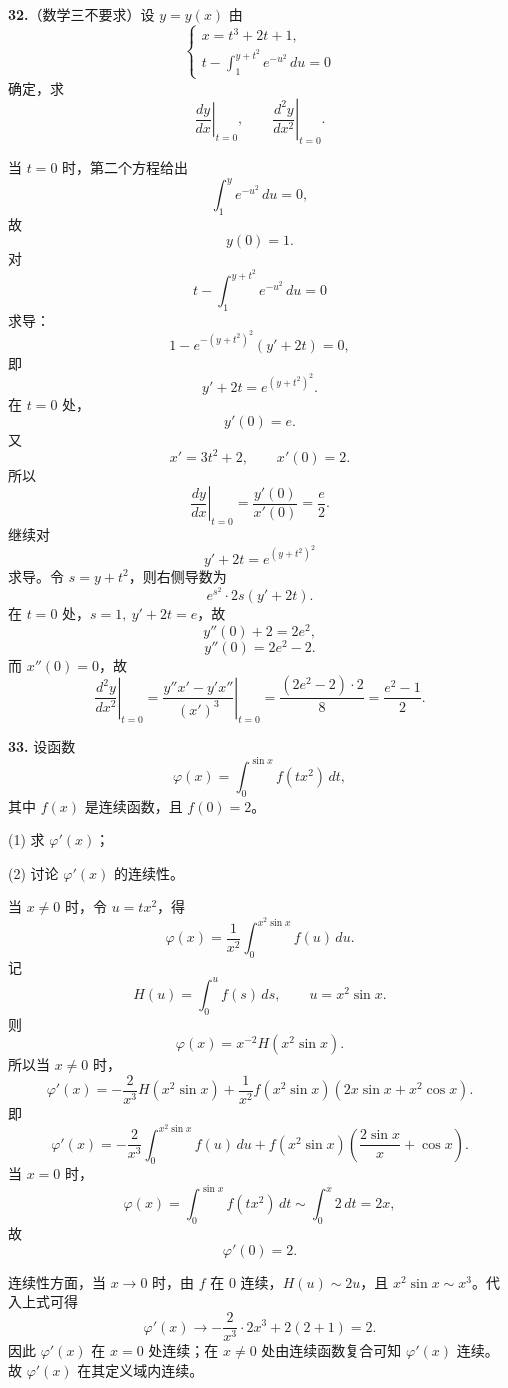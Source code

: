 \begin{problemblock}
\textbf{32.}（数学三不要求）设 \(y=y(x)\) 由
\[
\begin{cases}
x=t^3+2t+1,\\
t-\displaystyle\int_1^{y+t^2}e^{-u^2}\,du=0
\end{cases}
\]
确定，求
\[
\left.\frac{dy}{dx}\right|_{t=0},\qquad
\left.\frac{d^2y}{dx^2}\right|_{t=0}.
\]
\end{problemblock}

\begin{solutionblock}
当 \(t=0\) 时，第二个方程给出
\[
\int_1^y e^{-u^2}\,du=0,
\]
故
\[
y(0)=1.
\]
对
\[
t-\int_1^{y+t^2}e^{-u^2}\,du=0
\]
求导：
\[
1-e^{-(y+t^2)^2}(y'+2t)=0,
\]
即
\[
y'+2t=e^{(y+t^2)^2}.
\]
在 \(t=0\) 处，
\[
y'(0)=e.
\]
又
\[
x'=3t^2+2,\qquad x'(0)=2.
\]
所以
\[
\left.\frac{dy}{dx}\right|_{t=0}=\frac{y'(0)}{x'(0)}=\frac e2.
\]
继续对
\[
y'+2t=e^{(y+t^2)^2}
\]
求导。令 \(s=y+t^2\)，则右侧导数为
\[
e^{s^2}\cdot2s(y'+2t).
\]
在 \(t=0\) 处，\(s=1,\ y'+2t=e\)，故
\[
y''(0)+2=2e^2,
\]
\[
y''(0)=2e^2-2.
\]
而 \(x''(0)=0\)，故
\[
\left.\frac{d^2y}{dx^2}\right|_{t=0}
=\left.\frac{y''x'-y'x''}{(x')^3}\right|_{t=0}
=\frac{(2e^2-2)\cdot2}{8}
=\frac{e^2-1}{2}.
\]
\end{solutionblock}

\begin{problemblock}
\textbf{33.} 设函数
\[
\varphi(x)=\int_0^{\sin x}f(tx^2)\,dt,
\]
其中 \(f(x)\) 是连续函数，且 \(f(0)=2\)。

(1) 求 \(\varphi'(x)\)；

(2) 讨论 \(\varphi'(x)\) 的连续性。
\end{problemblock}

\begin{solutionblock}
当 \(x\ne0\) 时，令 \(u=tx^2\)，得
\[
\varphi(x)=\frac1{x^2}\int_0^{x^2\sin x}f(u)\,du.
\]
记
\[
H(u)=\int_0^u f(s)\,ds,\qquad u=x^2\sin x.
\]
则
\[
\varphi(x)=x^{-2}H(x^2\sin x).
\]
所以当 \(x\ne0\) 时，
\[
\varphi'(x)
=-\frac2{x^3}H(x^2\sin x)
+\frac1{x^2}f(x^2\sin x)(2x\sin x+x^2\cos x).
\]
即
\[
\varphi'(x)=
-\frac{2}{x^3}\int_0^{x^2\sin x}f(u)\,du
+f(x^2\sin x)\left(\frac{2\sin x}{x}+\cos x\right).
\]
当 \(x=0\) 时，
\[
\varphi(x)=\int_0^{\sin x}f(tx^2)\,dt
\sim\int_0^{x}2\,dt=2x,
\]
故
\[
\varphi'(0)=2.
\]

连续性方面，当 \(x\to0\) 时，由 \(f\) 在 0 连续，\(H(u)\sim2u\)，且 \(x^2\sin x\sim x^3\)。代入上式可得
\[
\varphi'(x)\to -\frac2{x^3}\cdot 2x^3+2(2+1)=2.
\]
因此 \(\varphi'(x)\) 在 \(x=0\) 处连续；在 \(x\ne0\) 处由连续函数复合可知 \(\varphi'(x)\) 连续。故 \(\varphi'(x)\) 在其定义域内连续。
\end{solutionblock}

